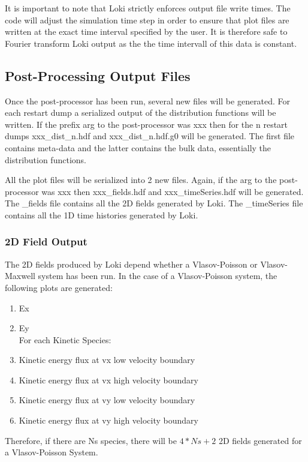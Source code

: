 \documentclass[11pt]{amsart}
\begin{document}
It is important to note that Loki strictly enforces output file write times.
The code will adjust the simulation time step in order to ensure that plot
files are written at the exact time interval specified by the user.  It is
therefore safe to Fourier transform Loki output as the the time intervall of
this data is constant.

\subsection*{Post-Processing Output Files}
Once the post-processor has been run, several new files will be generated.  For
each restart dump a serialized output of the distribution functions will be
written.  If the prefix arg to the post-processor was xxx then for the n
restart dumps xxx\_dist\_n.hdf and xxx\_dist\_n.hdf.g0 will be generated.  The
first file contains meta-data and the latter contains the bulk data,
essentially the distribution functions.

All the plot files will be serialized into 2 new files.  Again, if the arg to
the post-processor was xxx then xxx\_fields.hdf and xxx\_timeSeries.hdf will be
generated.  The \_fields file contains all the 2D fields generated by Loki.
The \_timeSeries file contains all the 1D time histories generated by Loki.

\subsubsection*{2D Field Output}
The 2D fields produced by Loki depend whether a Vlasov-Poisson or
Vlasov-Maxwell system has been run.  In the case of a Vlasov-Poisson system,
the following plots are generated:
\begin{enumerate}
\item Ex
\item Ey \\
For each Kinetic Species:
\item Kinetic energy flux at vx low velocity boundary
\item Kinetic energy flux at vx high velocity boundary
\item Kinetic energy flux at vy low velocity boundary
\item Kinetic energy flux at vy high velocity boundary
\end{enumerate}
Therefore, if there are Ns species, there will be $4*Ns+2$ 2D fields generated
for a Vlasov-Poisson System.
\end{document}

